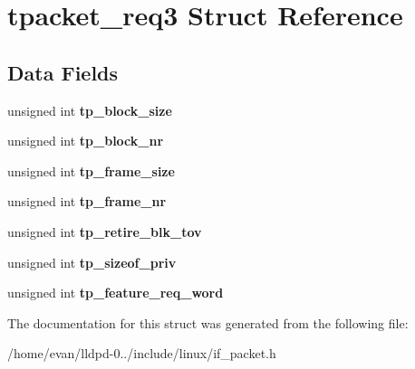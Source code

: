\section{tpacket\-\_\-req3 \-Struct \-Reference}
\label{structtpacket__req3}
\subsection*{\-Data \-Fields}
\begin{DoxyCompactItemize}
\item 
unsigned int {\bfseries tp\-\_\-block\-\_\-size}\label{structtpacket__req3_a217e9dd8067a2fd5245a08ae93c6499a}

\item 
unsigned int {\bfseries tp\-\_\-block\-\_\-nr}\label{structtpacket__req3_a665aad782885db025da04d47eb661207}

\item 
unsigned int {\bfseries tp\-\_\-frame\-\_\-size}\label{structtpacket__req3_af58766f0b8818250a2e9de278f523f1e}

\item 
unsigned int {\bfseries tp\-\_\-frame\-\_\-nr}\label{structtpacket__req3_a152d5525af0df60e838039fbb3ab119d}

\item 
unsigned int {\bfseries tp\-\_\-retire\-\_\-blk\-\_\-tov}\label{structtpacket__req3_aff7138fbbb75c98778e5f7d1b31b2664}

\item 
unsigned int {\bfseries tp\-\_\-sizeof\-\_\-priv}\label{structtpacket__req3_a69a9aa4ed65b7eea6e36ae3dc4fbb98c}

\item 
unsigned int {\bfseries tp\-\_\-feature\-\_\-req\-\_\-word}\label{structtpacket__req3_a704813d9279e370180f18a5cb8c19445}

\end{DoxyCompactItemize}


\-The documentation for this struct was generated from the following file\-:\begin{DoxyCompactItemize}
\item 
/home/evan/lldpd-\/0../include/linux/if\-\_\-packet.\-h\end{DoxyCompactItemize}
